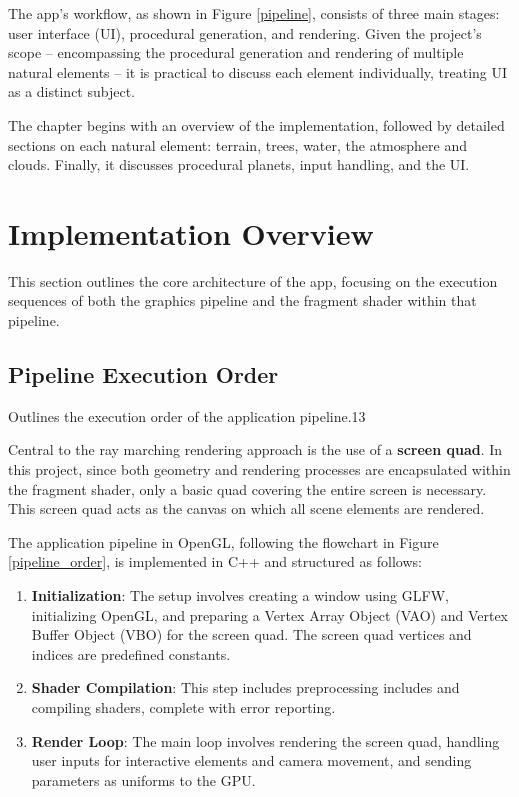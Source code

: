 \label{sec:3}

The app's workflow, as shown in Figure \ref{pipeline}, consists of three main stages: user interface (UI), procedural generation, and rendering. Given the project's scope -- encompassing the procedural generation and rendering of multiple natural elements -- it is practical to discuss each element individually, treating UI as a distinct subject.

The chapter begins with an overview of the implementation, followed by detailed sections on each natural element: terrain, trees, water, the atmosphere and clouds. Finally, it discusses procedural planets, input handling, and the UI.

\section{Implementation Overview}
\label{Implementation Overview}

This section outlines the core architecture of the app, focusing on the execution sequences of both the graphics pipeline and the fragment shader within that pipeline.

\subsection{Pipeline Execution Order}
\label{Pipeline Execution Order}

{Outlines the execution order of the application pipeline.}{13}

Central to the ray marching rendering approach is the use of a \textbf{screen quad}. In this project, since both geometry and rendering processes are encapsulated within the fragment shader, only a basic quad covering the entire screen is necessary. This screen quad acts as the canvas on which all scene elements are rendered.


The application pipeline in OpenGL, following the flowchart in Figure \ref{pipeline_order}, is implemented in C++ and structured as follows:


\begin{enumerate}
    \item \textbf{Initialization}: The setup involves creating a window using GLFW, initializing OpenGL, and preparing a Vertex Array Object (VAO) and Vertex Buffer Object (VBO) for the screen quad. The screen quad vertices and indices are predefined constants.
    \item \textbf{Shader Compilation}: This step includes preprocessing includes and compiling shaders, complete with error reporting.
    \item \textbf{Render Loop}: The main loop involves rendering the screen quad, handling user inputs for interactive elements and camera movement, and sending parameters as uniforms to the GPU.
\end{enumerate}

